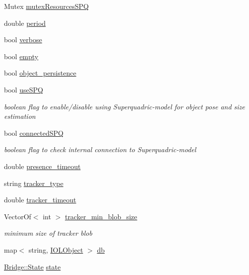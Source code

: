 \begin{DoxyCompactItemize}
\item 
Mutex \hyperlink{group__iol2opc_adb9723473c9839da678d067758813e72}{mutex\+Resources\+S\+PQ}
\item 
double \hyperlink{group__iol2opc_ab76800629942b2263b2b9cb3d94cba9d}{period}
\item 
bool \hyperlink{group__iol2opc_af6ea487a8920c984b65bbf94f3dd9b7d}{verbose}
\item 
bool \hyperlink{group__iol2opc_a294e1534e6a04f621810a1d5be591e6f}{empty}
\item 
bool \hyperlink{group__iol2opc_a5ae5263a8e26d31c563782bea99ed577}{object\+\_\+persistence}
\item 
bool \hyperlink{group__iol2opc_a0810f28176726d22c6a5990cbfd86d56}{use\+S\+PQ}
\begin{DoxyCompactList}\small\item\em boolean flag to enable/disable using Superquadric-\/model for object pose and size estimation \end{DoxyCompactList}\item 
bool \hyperlink{group__iol2opc_aa51599d805d2e204420448c254fd90fb}{connected\+S\+PQ}
\begin{DoxyCompactList}\small\item\em boolean flag to check internal connection to Superquadric-\/model \end{DoxyCompactList}\item 
double \hyperlink{group__iol2opc_a830b1fc76e62720585c729fba6775dae}{presence\+\_\+timeout}
\item 
string \hyperlink{group__iol2opc_a8dc202854b79330a34a0233b87076267}{tracker\+\_\+type}
\item 
double \hyperlink{group__iol2opc_a2927446ee6c368d8173aa67022c936e6}{tracker\+\_\+timeout}
\item 
Vector\+Of$<$ int $>$ \hyperlink{group__iol2opc_a35271a1cfeea9b703afc16e684ff18dd}{tracker\+\_\+min\+\_\+blob\+\_\+size}
\begin{DoxyCompactList}\small\item\em minimum size of tracker blob \end{DoxyCompactList}\item 
map$<$ string, \hyperlink{group__iol2opc_classIOLObject}{I\+O\+L\+Object} $>$ \hyperlink{group__iol2opc_ad1c7be159c8f139565088dcfd502cf56}{db}
\item 
\hyperlink{namespaceBridge_a58acad8bf83b6df8e000fd21a8be62a9}{Bridge\+::\+State} \hyperlink{group__iol2opc_a1362fad5d1cca317ac6c632075dd4ef7}{state}
\item 

\end{DoxyCompactItemize}
